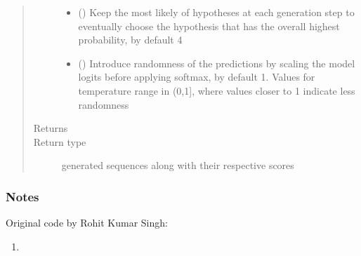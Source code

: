 \documentclass[letterpaper,10pt,english]{sphinxmanual}
\begin{document}
\begin{fulllineitems}
\begin{fulllineitems}
\begin{quote}
\begin{description}
\begin{itemize}
\item {} 
\sphinxAtStartPar
{} (\sphinxstyleliteralemphasis{\sphinxupquote{, }}) \textendash{} Keep the most likely  of hypotheses at each generation step to
eventually choose the hypothesis that has the overall highest probability,
by default 4

\item {} 
\sphinxAtStartPar
{} (\sphinxstyleliteralemphasis{\sphinxupquote{, }}) \textendash{} Introduce randomness of the predictions by scaling the model logits before
applying softmax, by default 1. Values for temperature range in (0,1{]}, where
values closer to 1 indicate less randomness

\end{itemize}

\item[{Returns}] \leavevmode
\sphinxAtStartPar


\item[{Return type}] \leavevmode
\sphinxAtStartPar
{} generated sequences along with their respective scores

\end{description}\end{quote}
\subsubsection*{Notes}

\sphinxAtStartPar
Original code by Rohit Kumar Singh:
\begin{enumerate}
%
\item {} 
\sphinxAtStartPar
{}

\end{enumerate}

\end{fulllineitems}



\end{fulllineitems}
\end{document}
